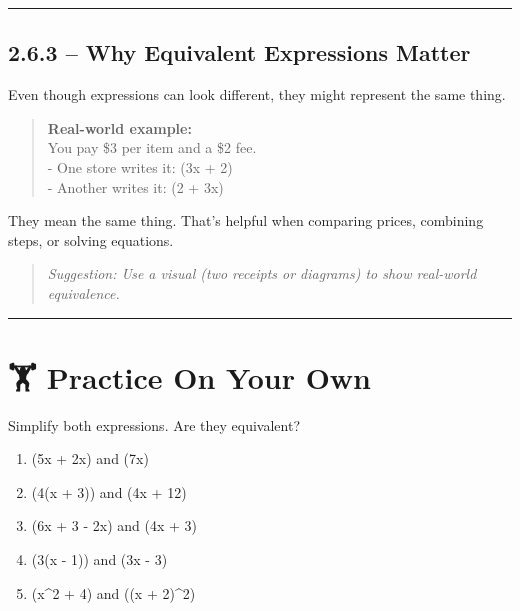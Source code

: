 \documentclass[
  letterpaper,
  DIV=11,
  numbers=noendperiod]{scrreprt}
\providecommand{\tightlist}{%
  \setlength{\itemsep}{0pt}\setlength{\parskip}{0pt}}
\begin{document}
\begin{center}\rule{0.5\linewidth}{0.5pt}\end{center}

\subsection*{2.6.3 -- Why Equivalent Expressions
Matter}\label{why-equivalent-expressions-matter}

Even though expressions can look different, they might represent the
same thing.

\begin{quote}
\textbf{Real-world example:}\\
You pay \$3 per item and a \$2 fee.\\
- One store writes it: (3x + 2)\\
- Another writes it: (2 + 3x)
\end{quote}

They mean the same thing. That's helpful when comparing prices,
combining steps, or solving equations.

\begin{quote}
\emph{Suggestion: Use a visual (two receipts or diagrams) to show
real-world equivalence.}
\end{quote}

\begin{center}\rule{0.5\linewidth}{0.5pt}\end{center}

\section*{🏋️ Practice On Your Own}\label{practice-on-your-own-12}


Simplify both expressions. Are they equivalent?

\begin{enumerate}
\def\labelenumi{\arabic{enumi}.}
\tightlist
\item
  (5x + 2x) and (7x)\\
\item
  (4(x + 3)) and (4x + 12)\\
\item
  (6x + 3 - 2x) and (4x + 3)\\
\item
  (3(x - 1)) and (3x - 3)\\
\item
  (x\^{}2 + 4) and ((x + 2)\^{}2)
\end{enumerate}
\end{document}
